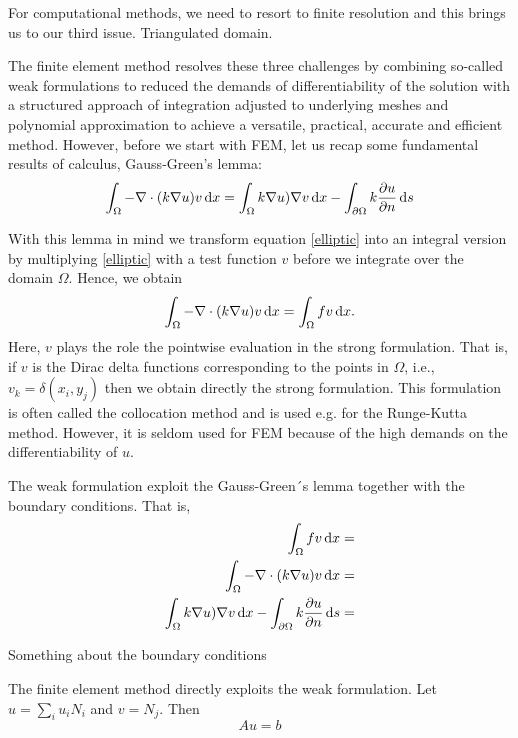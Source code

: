 For computational methods, we need to resort to finite resolution and this brings us to our third 
issue. Triangulated domain. 

The finite element method resolves these three challenges by combining so-called weak formulations
to reduced the demands of differentiability of the solution with a structured approach of integration
adjusted to underlying meshes and polynomial approximation to achieve a versatile, practical, accurate
and efficient method. However, before we start with FEM, let us recap some fundamental results of calculus, 
Gauss-Green's lemma: 
\begin{equation}
\label{gaussgreen}
\int_\Omega 
-\nabla\cdot(k\nabla u) v \, \mathrm{d}x =  
\int_\Omega k\nabla u) \nabla v \, \mathrm{d}x  - \int_{\partial \Omega} k\frac{\partial u} {\partial n} \, \mathrm{d}s 
\end{equation}

With this lemma in mind we transform equation \eqref{elliptic} into an integral version by multiplying
\eqref{elliptic} with a test function $v$ before we integrate over the domain $\Omega$. Hence, 
we obtain  
\begin{equation}
\label{gaussgreen}
\int_\Omega -\nabla\cdot(k\nabla u) v \, \mathrm{d}x =  \int_\Omega f v \, \mathrm{d}x .  
\end{equation}
Here, $v$ plays the role the pointwise evaluation in the strong formulation. That is, 
if $v$ is the Dirac delta functions corresponding to the points in $\Omega$, i.e.,  $v_k = \delta(x_i, y_j)$
then we obtain directly the strong formulation. This formulation is often called
the collocation method and is used e.g. for the Runge-Kutta method. However, it is 
seldom used for FEM because of the high demands on the differentiability of $u$. 

The weak formulation exploit the Gauss-Green´s lemma together with the boundary conditions. That is,  
\begin{eqnarray*}
\label{gaussgreen}
\int_\Omega f v \, \mathrm{d}x =  \\ 
\int_\Omega -\nabla\cdot(k\nabla u) v \, \mathrm{d}x =  \\ 
\int_\Omega k\nabla u) \nabla v \, \mathrm{d}x  - \int_{\partial \Omega} k\frac{\partial u} {\partial n} \, \mathrm{d}s =  
\end{eqnarray*}

Something about the boundary conditions 

The finite element method directly exploits the weak formulation. 
Let $u = \sum_i u_i N_i$ and $v=N_j$. 
Then 
\[
A u = b 
\]


